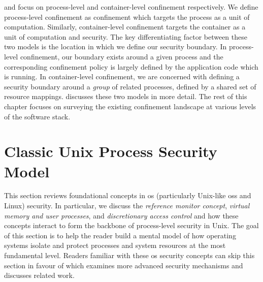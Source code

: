 

\bpfbox{} and \bpfcontain{} focus on process-level and container-level confinement
respectively. We define process-level confinement as confinement which targets the process
as a unit of computation. Similarly, container-level confinement targets the container as
a unit of computation and security. The key differentiating factor between these two
models is the location in which we define our security boundary. In process-level
confinement, our boundary exists around a given process and the corresponding confinement
policy is largely defined by the application code which is running. In container-level
confinement, we are concerned with defining a security boundary around a \textit{group} of
related processes, defined by a shared set of resource mappings.
 discusses these two models in more detail. The rest of this
chapter focuses on surveying the existing confinement landscape at various levels of the
software stack.

\section{Classic Unix Process Security Model}%
\label{s:process-security-model}

This section reviews foundational concepts in \gls{os} (particularly Unix-like \gls{os}s
and Linux) security. In particular, we discuss the \textit{reference monitor concept},
\textit{virtual memory and user processes}, and \textit{discretionary access control} and
how these concepts interact to form the backbone of process-level security in Unix.  The
goal of this section is to help the reader build a mental model of how operating systems
isolate and protect processes and system resources at the most fundamental level. Readers
familiar with these \gls{os} security concepts can skip this section in favour of
 which examines more advanced security mechanisms and
discusses related work.

